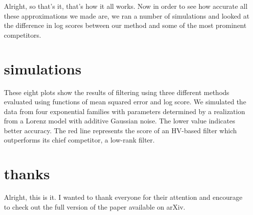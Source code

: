 \documentclass[14pt]{extarticle} %
\begin{document}
Alright, so that's it, that's how it all works. Now in order to see how accurate all these approximations we made are, we ran a number of simulations and looked at the difference in log scores between our method and some of the most prominent competitors. 


\newpage
\section*{simulations}


These eight plots show the results of filtering using three different methods evaluated using functions of mean squared error and log score. We simulated the data from four exponential families with parameters determined by a realization from a Lorenz model with additive Gaussian noise. The lower value indicates better accuracy. The red line represents the score of an HV-based filter which outperforms its chief competitor, a low-rank filter.



\newpage
\section*{thanks}


Alright, this is it. I wanted to thank everyone for their attention and encourage to check out the full version of the paper available on arXiv.
\end{document}
